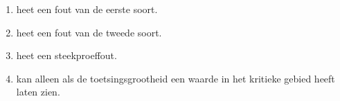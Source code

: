 \begin{enumerate}[label=(\alph*)]
    \item heet een fout van de eerste soort.
    \item heet een fout van de tweede soort.
    \item heet een steekproeffout.
    \item kan alleen als de toetsingsgrootheid een waarde in het kritieke gebied heeft laten zien.
\end{enumerate}
